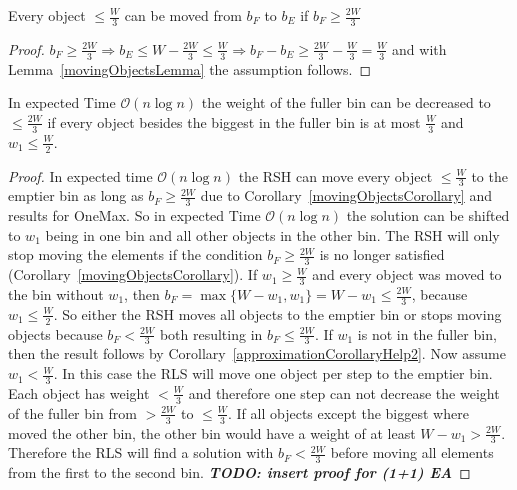 \begin{corollary}\label{movingObjectsCorollary}
    Every object \(\le \frac{W}{3}\) can be moved from $b_F$ to $b_E$ if \(b_F \ge \frac{2W}{3}\)
\end{corollary}
\begin{proof}
    \(b_F \ge \frac{2W}{3} \Rightarrow b_E \le W - \frac{2W}{3} \le \frac{W}{3} \Rightarrow b_F - b_E \ge \frac{2W}{3} - \frac{W}{3} = \frac{W}{3}\) and with Lemma~\ref{movingObjectsLemma} the assumption follows.
\end{proof}

\begin{lemma}\label{movingObjectsLemma2}
    In expected Time $\mathcal{O}(n\log{}n)$ the weight of the fuller bin can be decreased to \(\le \frac{2W}{3}\) if every object besides the biggest in the fuller bin is at most $\frac{W}{3}$ and \(w_1 \le \frac{W}{2}\).
\end{lemma}
\begin{proof}
    In expected time $\mathcal{O}(n\log{}n)$ the RSH can move every object $\le \frac{W}{3}$ to the emptier bin as long as $b_F \ge \frac{2W}{3}$ due to Corollary~\ref{movingObjectsCorollary} and results for OneMax. So in expected Time $\mathcal{O}(n\log{}n)$ the solution can be shifted to $w_1$ being in one bin and all other objects in the other bin. The RSH will only stop moving the elements if the condition $b_F \ge \frac{2W}{3}$ is no longer satisfied (Corollary~\ref{movingObjectsCorollary}). If \(w_1 \ge \frac{W}{3}\) and every object was moved to the bin without $w_1$, then \(b_F = \max\{W-w_1, w_1\} = W-w_1 \le \frac{2W}{3}\), because \(w_1 \le \frac{W}{2}\). So either the RSH moves all objects to the emptier bin or stops moving objects because $b_F < \frac{2W}{3}$ both resulting in $b_F \le \frac{2W}{3}$. If $w_1$ is not in the fuller bin, then the result follows by Corollary~\ref{approximationCorollaryHelp2}.\newline
    Now assume \(w_1 < \frac{W}{3}\). In this case the RLS will move one object per step to the emptier bin. Each object has weight $< \frac{W}{3}$ and therefore one step can not decrease the weight of the fuller bin from $> \frac{2W}{3}$ to $\le \frac{W}{3}$. If all objects except the biggest where moved the other bin, the other bin would have a weight of at least \(W-w_1 > \frac{2W}{3}\). Therefore the RLS will find a solution with $b_F < \frac{2W}{3}$ before moving all elements from the first to the second bin. \textbf{\textit{TODO: insert proof for (1+1) EA}}
\end{proof}

